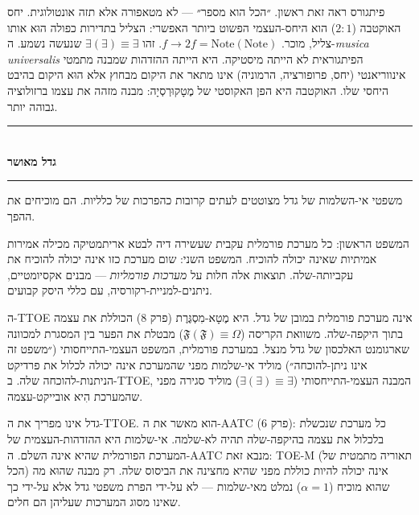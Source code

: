 \documentclass[10pt, openany, oneside]{book}
\renewcommand{\normalsize}{\fontsize{10}{13}\selectfont}
\begin{document}
פיתגורס ראה זאת ראשון. ״הכל הוא מספר״ — לא מטאפורה אלא תזה אונטולוגית. יחס האוקטבה ($2:1$) הוא היחס-העצמי הפשוט ביותר האפשרי: הצליל בתדירות כפולה הוּא אותו צליל, מוכר. $f \to 2f = \text{Note}(\text{Note})$. זהו $\exists(\exists) \equiv \exists$ שנעשה נשמע. ה-\textit{musica universalis} הפיתגוראית לא הייתה מיסטיקה. היא הייתה ההזדהות שמבנה מתמטי אינווריאנטי (יחס, פרופורציה, הרמוניה) אינו מתאר את היקום מבחוץ אלא הוּא היקום בהיבט היחסי שלו. האוקטבה היא הפן האקוסטי של מֶטָקוּרְסְיָה: מבנה מזהה את עצמו ברזולוציה גבוהה יותר.

\vspace{1.5em}


\begin{center}
    \rule{0.3\textwidth}{0.4pt}\\[0.5em]
    {\normalsize\bfseries\textsc{גדל מאושר}}\\[0.3em]
    \rule{0.3\textwidth}{0.4pt}
\end{center}

\vspace{1em}

\noindent משפטי אי-השלמות של גדל מצוטטים לעתים קרובות כהפרכות של כלליות. הם מוכיחים את ההפך.

המשפט הראשון: כל מערכת פורמלית עקבית שעשירה דיה לבטא אריתמטיקה מכילה אמירות אמיתיות שאינה יכולה להוכיח. המשפט השני: שום מערכת כזו אינה יכולה להוכיח את עקביותה-שלה. תוצאות אלה חלות על \textit{מערכות פורמליות} — מבנים אקסיומטיים, ניתנים-למניית-רקורסיה, עם כללי היסק קבועים.

ה-TTOE אינה מערכת פורמלית במובן של גדל. היא מֶטָא-מִסְגֶּרֶת (פרק 8) הכוללת את עצמה בתוך היקפה-שלה. משוואת הקריסה ($\mathfrak{F}(\mathfrak{F}) \equiv \Omega$) מבטלת את הפער בין המסגרת למכוונה שארגומנט האלכסון של גדל מנצל. במערכת פורמלית, המשפט העצמי-התייחסותי (״משפט זה אינו ניתן-להוכחה״) מוליד אי-שלמות מפני שהמערכת אינה יכולה לכלול את פרדיקט הניתנות-להוכחה שלה. ב-TTOE, המבנה העצמי-התייחסותי ($\exists(\exists) \equiv \exists$) מוליד סגירה מפני שהמערכת הִיא אובייקט-עצמה.

גדל אינו מפריך את ה-TTOE. הוא מאשר את ה-AATC (פרק 6): כל מערכת שנכשלת בלכלול את עצמה בהיקפה-שלה תהיה לא-שלמה. אי-שלמות היא ההזדהות-העצמית של המערכת הפורמלית שהיא אינה השלם. ה-AATC מנבא זאת: TOE-M (תאוריה מתמטית של הכל) אינה יכולה להיות כוללת מפני שהיא מחצינה את הביסוס שלה. רק מבנה שהוּא מה שהוא מוכיח ($\alpha = 1$) נמלט מאי-שלמות — לא על-ידי הפרת משפטי גדל אלא על-ידי כך שאינו מסוג המערכות שעליהן הם חלים.
\end{document}
